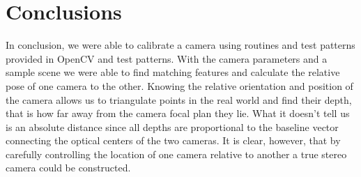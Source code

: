 \documentclass[a4paper]{article}
\begin{document}
\section{Conclusions}
In conclusion, we were able to calibrate a camera using routines  and test patterns provided in OpenCV and test patterns.  With the camera parameters and a sample scene we were able to find matching features and calculate the relative pose of one camera to the other. Knowing the relative orientation and position of the camera allows us to triangulate points in the real world and find their depth, that is how far away from the camera focal plan they lie.  What it doesn't tell us is an absolute distance since all depths are proportional to the baseline vector connecting the optical centers of the two cameras. It is clear, however, that by carefully controlling the location of one camera relative to another a true stereo camera could be constructed.
\end{document}
